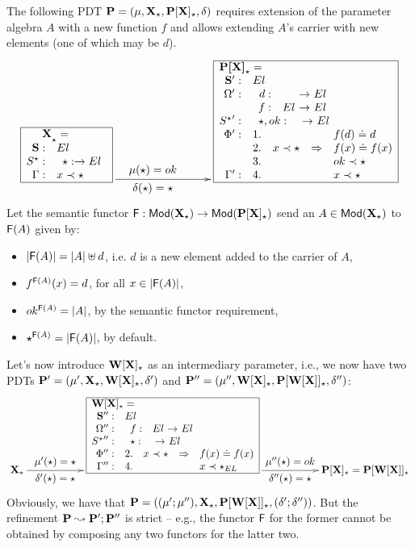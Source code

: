 \begin{example}\label{ex:abstrref}
The following PDT $\thr P=\pdt$ requires extension of the parameter algebra $A$ with a new
function $f$ and allows extending $A$'s carrier with
new elements (one of which may be $d$). 
\[\xymatrix{
\frame{\txt{$\spec{\tit{\mbox{\bf \spec\ X}_\cons=} \\
		\spSort{El}
		\spOps{\allcons}{ \cons: \to El}
		\Gamma:
			& x \prec \cons
}$}}
\ar[rrr]^<<<<<<<<<<<<{\txt{$\large{\mu(\cons)= ok}$}}_<<<<<<<<<<<<{\txt{$\large{\delta(\cons)={\cons}}$}} 
&&& \frame{\txt{$\spec{\tit{\mbox{\bf P[X]}_\cons=} \\
	\spSorts{\Sorts'}{El}
	\spOps{\Ops'}{
		d:	&& El \\
		f: & El & El }
	\spOps{{\allcons}'}{	\cons, ok: && El}
	\Phi':
		&1.& && f(d) \eleq d\\
		&2.&x\prec \cons &\To& f(x) \eleq f(x)\\
		&3.& && ok\prec\cons \\
	\Gamma':&4.& && x \prec \cons\\
}$}}
}
\]
Let the semantic functor $\fu{F}: \Mod(\thr{X_\cons}) \to
	\Mod(\thr{P[X]_\cons})$ send an $A\in\Mod(\thr{X_\cons})$ to $\fu
	F(A)$ given by:
\begin{itemize}\MyLPar
\item $|\fu{F}(A)| = |A| \uplus d$, i.e. $d$ is a new element added to the carrier of $A$,
\item $f^{\fu{F}(A)}(x)= d$, for all $x\in|\fu F(A)|$,
\item $ok^{\fu{F}(A)} = |A|$, by the semantic functor requirement,
\item $\cons^{\fu{F}(A)} = |\fu{F}(A)|$, by default.
\end{itemize}
Let's now introduce $\thr{W[X]_\cons}$ as an intermediary parameter, i.e., we
now have two PDTs $\thr
P'=\pdtsp{\mu'}{\delta'}{\thr{X_\cons}}{\thr{W[X]_\cons}}$ and
$\thr P''=\pdtsp{\mu''}{\delta''}{\thr{W[X]_\cons}}{\thr{P[W[X]]_\cons}}$:
\[ \xymatrix{
\thr{X_\cons}
\ar[rr]^<<<<<<<<<<{\txt{$\large{\mu'(\cons)=\cons}$}}_<<<<<<<<<<{\txt{$\large{\delta'(\cons)=\cons}$}}
&& \frame{\txt{$\spec{
\tit{\thr{W[X]_\cons}=}\\
	\spSorts{\Sorts''}{El}
	\spOps{\Ops''}{f: &El & El}
	\spOps{{\allcons}''}{\cons: && El}
	\Phi'':
		 &2.& x\prec\cons&\To& f(x) \eleq f(x)\\
	\Gamma'':&4.& && x \prec \cons_{EL}\\
}$}}
\ar[rr]^<<<<<<<<<<{\txt{$\large{\mu''(\cons)=ok}$}}_<<<<<<<<<<{\txt{$\large{\delta''(\cons)=\cons}$}}  
&& \thr{P[X]_\cons}=\thr{P[W[X]]_\cons}
}
\]
Obviously, we have that $\thr P=\pdtsp{(\mu';\mu'')}{(\delta';\delta'')}{\thr
X_\cons}{\thr{P[W[X]]_\cons}}$. But the refinement $\thr P\leadsto \thr
P';\thr P''$ is strict -- e.g., the functor $\fu F$ for the former cannot be obtained
by composing any two functors for the latter two.


\end{example}
